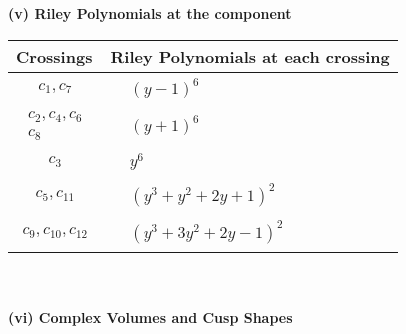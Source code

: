 \documentclass[1p]{elsarticle_modified}
\theoremstyle{definition}
\begin{document}
\newpage\renewcommand{\arraystretch}{1}
\flushleft \textbf{(v) Riley Polynomials at the component}\newline \\
\begin{tabular}{m{50pt}|m{274pt}}
Crossings & \hspace{64pt}Riley Polynomials at each crossing \\
\hline $$\begin{aligned}c_{1},c_{7}\end{aligned}$$&$\begin{aligned}
&(y-1)^6
\end{aligned}$\\
\hline $$\begin{aligned}c_{2},c_{4},c_{6}\\c_{8}\end{aligned}$$&$\begin{aligned}
&(y+1)^6
\end{aligned}$\\
\hline $$\begin{aligned}c_{3}\end{aligned}$$&$\begin{aligned}
&y^6
\end{aligned}$\\
\hline $$\begin{aligned}c_{5},c_{11}\end{aligned}$$&$\begin{aligned}
&(y^3+y^2+2 y+1)^2
\end{aligned}$\\
\hline $$\begin{aligned}c_{9},c_{10},c_{12}\end{aligned}$$&$\begin{aligned}
&(y^3+3 y^2+2 y-1)^2
\end{aligned}$\\
\hline
\end{tabular}\\~\\
\newpage\flushleft \textbf{(vi) Complex Volumes and Cusp Shapes}
\end{document}
